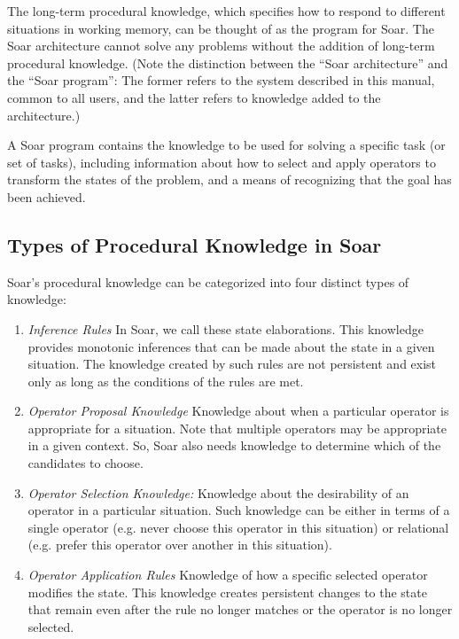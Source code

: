 The long-term procedural knowledge, which specifies how to respond to different
situations in working memory, can be thought of as the program for Soar.
The Soar architecture cannot solve any problems without the addition of
long-term procedural knowledge.  (Note the distinction between the ``Soar
architecture'' and the ``Soar program'': The former refers to the system
described in this manual, common to all users, and the latter refers to
knowledge added to the architecture.)

A Soar program contains the knowledge to be used for solving a specific
task (or set of tasks), including information about how to select and
apply operators to transform the states of the problem, and a means of
recognizing that the goal has been achieved.  

\subsection{Types of Procedural Knowledge in Soar}
\label{LIST:4KnowledgeTypes}

Soar's procedural knowledge can be categorized into  four distinct types of
knowledge:\vspace{-10pt} 
\begin{enumerate}
  \item \textit{Inference Rules} \newline 
In Soar, we call these state elaborations.  This knowledge provides monotonic inferences
that can be made about the state in a given situation. The knowledge created by such rules
are not persistent and exist only as long as the conditions of the rules are met.
  \item \textit{Operator Proposal Knowledge} \newline
Knowledge about when a particular operator is appropriate for a situation.
Note that multiple operators may be appropriate in a given context.
So, Soar also needs knowledge to determine which of the candidates to choose.  
  \item	\textit{Operator Selection Knowledge:} \newline
Knowledge about the desirability of an operator in a particular situation.
Such knowledge can be either in terms of a single operator (e.g. never choose this 
operator in this situation) or relational (e.g. prefer this operator over another
in this situation).
  \item \textit{Operator Application Rules} \newline
Knowledge of how a specific selected operator modifies the state.
This knowledge creates persistent changes to the state that remain even 
after the rule no longer matches or the operator is no longer selected.
\end{enumerate}

